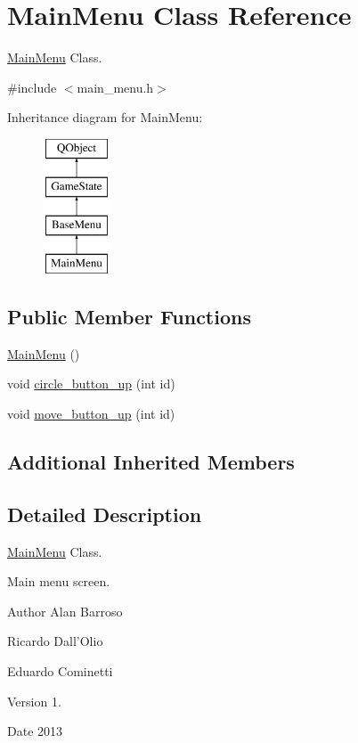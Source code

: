 \hypertarget{class_main_menu}{\section{Main\-Menu Class Reference}
\label{class_main_menu}
}


\hyperlink{class_main_menu}{Main\-Menu} Class.  




{\ttfamily \#include $<$main\-\_\-menu.\-h$>$}

Inheritance diagram for Main\-Menu\-:\begin{figure}[H]
\begin{center}
\leavevmode
\includegraphics[height=4.000000cm]{class_main_menu}
\end{center}
\end{figure}
\subsection*{Public Member Functions}
\begin{DoxyCompactItemize}
\item 
\hyperlink{class_main_menu_a53eecf9d5ffd094f54ac4193e7e57eaf}{Main\-Menu} ()
\item 
void \hyperlink{class_main_menu_a935875722d11fd91253e755cdec8548b}{circle\-\_\-button\-\_\-up} (int id)
\item 
void \hyperlink{class_main_menu_ac27ae7a7cf376c23a7f5f204c2243135}{move\-\_\-button\-\_\-up} (int id)
\end{DoxyCompactItemize}
\subsection*{Additional Inherited Members}


\subsection{Detailed Description}
\hyperlink{class_main_menu}{Main\-Menu} Class. 

Main menu screen. \begin{DoxyAuthor}{Author}
Alan Barroso 

Ricardo Dall'Olio 

Eduardo Cominetti 
\end{DoxyAuthor}
\begin{DoxyVersion}{Version}
1. 
\end{DoxyVersion}
\begin{DoxyDate}{Date}
2013 
\end{DoxyDate}


